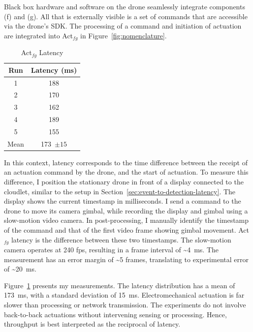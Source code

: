 Black box hardware and software on the drone seamlessly integrate
components (f) and (g).  All that is externally visible is a set of
commands that are accessible via the drone's SDK.
The processing of a command and initiation of actuation are integrated
into Act$_{fg}$ in Figure~\ref{fig:nomenclature}.
\begin{table}
\centering
\begin{tabular}{|c|c|}
\hline
Run & Latency (ms)\\
\hline
 1&188\\
 2&170\\
 3&162\\
 4&189\\
 5&155\\
\hline
Mean& 173~{\small$\pm15$}\\
\hline
\end{tabular}
\caption{Act$_{fg}$  Latency}
\label{tab:c2d-drone-histo}
\end{table}
In this context, latency corresponds to the time difference between
the receipt of an actuation command by the drone, and the start of
actuation.  To measure this difference, I position the stationary
drone in front of a display connected to the cloudlet, similar to the setup in Section~\ref{sec:event-to-detection-latency}.  The display
shows the current timestamp in milliseconds. I send a command to the
drone to move its camera gimbal, while recording the display and
gimbal using a slow-motion video camera. In post-processing, I
manually identify the timestamp of the command and that of the first
video frame showing gimbal movement.  Act$_{fg}$ latency is the
difference between these two timestamps.  The slow-motion camera
operates at 240 fps, resulting in a frame interval of
\textasciitilde4~ms.  The measurement has an error margin of
\textasciitilde5 frames, translating to experimental error of
\textasciitilde20~ms.

\endgroup

Figure~\ref{tab:c2d-drone-histo} presents my measurements.  The
latency distribution has a mean of 173~ms, with a standard deviation
of 15~ms.  Electromechanical actuation is far slower than processing
or network transmission.  The
experiments do not involve back-to-back actuations without
intervening sensing or processing. Hence, throughput is best
interpreted as the reciprocal of latency.


